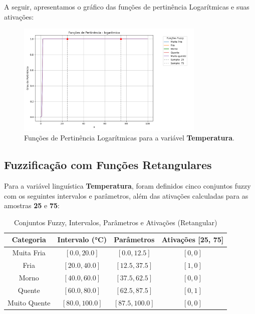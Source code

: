 \documentclass[a4paper,12pt]{article}
\begin{document}
A seguir, apresentamos o gráfico das funções de pertinência Logarítmicas e suas ativações:

\begin{figure}[H]
    \centering
    \includegraphics[width=0.8\textwidth]{img/funções_de_pertinência_logaritmica_fuzzificado.png}
    \caption{Funções de Pertinência Logarítmicas para a variável \textbf{Temperatura}.}
\end{figure}

\subsection{Fuzzificação com Funções Retangulares}

Para a variável linguística \textbf{Temperatura}, foram definidos cinco conjuntos fuzzy com os seguintes intervalos e parâmetros, além das ativações calculadas para as amostras \textbf{25} e \textbf{75}:

\begin{table}[H]
\centering
\caption{Conjuntos Fuzzy, Intervalos, Parâmetros e Ativações (Retangular)}
\begin{tabular}{|c|c|c|c|}
\hline
\textbf{Categoria}    & \textbf{Intervalo (°C)} & \textbf{Parâmetros}       & \textbf{Ativações [25, 75]} \\ \hline
Muita Fria            & $[0.0, 20.0]$          & $[0.0, 12.5]$             & $[0, 0]$                   \\ \hline
Fria                  & $[20.0, 40.0]$         & $[12.5, 37.5]$            & $[1, 0]$                   \\ \hline
Morno                 & $[40.0, 60.0]$         & $[37.5, 62.5]$            & $[0, 0]$                   \\ \hline
Quente                & $[60.0, 80.0]$         & $[62.5, 87.5]$            & $[0, 1]$                   \\ \hline
Muito Quente          & $[80.0, 100.0]$        & $[87.5, 100.0]$           & $[0, 0]$                   \\ \hline
\end{tabular}
\end{table}
\end{document}
